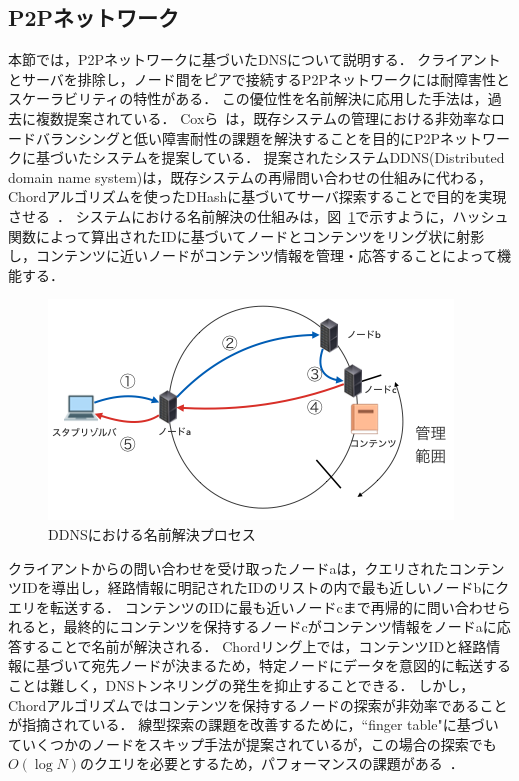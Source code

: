 \subsection{P2Pネットワーク}
本節では，P2Pネットワークに基づいたDNSについて説明する．
クライアントとサーバを排除し，ノード間をピアで接続するP2Pネットワークには耐障害性とスケーラビリティの特性がある．
この優位性を名前解決に応用した手法は，過去に複数提案されている．
Coxら~\cite{cox}は，既存システムの管理における非効率なロードバランシングと低い障害耐性の課題を解決することを目的にP2Pネットワークに基づいたシステムを提案している．
提案されたシステムDDNS(Distributed domain name system)は，既存システムの再帰問い合わせの仕組みに代わる，Chordアルゴリズムを使ったDHashに基づいてサーバ探索することで目的を実現させる~\cite{dhash}．
システムにおける名前解決の仕組みは，図~\ref{fig:chord}で示すように，ハッシュ関数によって算出されたIDに基づいてノードとコンテンツをリング状に射影し，コンテンツに近いノードがコンテンツ情報を管理・応答することによって機能する．
\begin{figure}[bhtp]
 \centering
 \label{fig:chord}
 \includegraphics[scale=0.6]{figure/chord-mechanism.png}
 \caption{DDNSにおける名前解決プロセス}
\end{figure}
クライアントからの問い合わせを受け取ったノードaは，クエリされたコンテンツIDを導出し，経路情報に明記されたIDのリストの内で最も近しいノードbにクエリを転送する．
コンテンツのIDに最も近いノードcまで再帰的に問い合わせられると，最終的にコンテンツを保持するノードcがコンテンツ情報をノードaに応答することで名前が解決される．
Chordリング上では，コンテンツIDと経路情報に基づいて宛先ノードが決まるため，特定ノードにデータを意図的に転送することは難しく，DNSトンネリングの発生を抑止することできる．
しかし，Chordアルゴリズムではコンテンツを保持するノードの探索が非効率であることが指摘されている．
線型探索の課題を改善するために，``finger table"に基づいていくつかのノードをスキップ手法が提案されているが，この場合の探索でも$O(\log N)$のクエリを必要とするため，パフォーマンスの課題がある~\cite{p_donas}．

